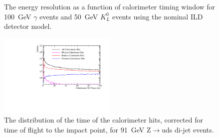 \begin{figure}[h!]
\caption[The energy resolution as a function of calorimeter timing window for \protect{} 100~GeV $\gamma$ events and \protect{} 50~GeV $K^{0}_{L}$ events using the nominal ILD detector model.]{The energy resolution as a function of calorimeter timing window for \protect{} 100~GeV $\gamma$ events and \protect{} 50~GeV $K^{0}_{L}$ events using the nominal ILD detector model.}
\label{fig:ertimingcuts}
\end{figure}

\begin{figure}[h!]
\centering
\includegraphics[width=0.5\textwidth]{OptimisationStudies/Plots/Description/CalorimeterHitTimes_91GeV_Z_uds_Steel.pdf}
\caption[The distribution of the time of the calorimeter hits, corrected for time of flight to the impact point, for 91~GeV Z$\rightarrow$uds di-jet events.]{The distribution of the time of the calorimeter hits, corrected for time of flight to the impact point, for 91~GeV Z$\rightarrow$uds di-jet events.}
\label{fig:calohittiming}
\end{figure} 

